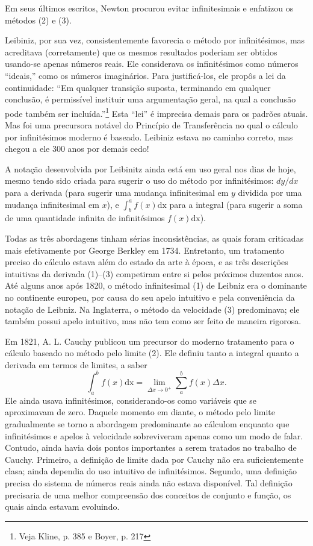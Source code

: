 Em seus últimos escritos, Newton procurou evitar infinitesimais e
enfatizou os métodos (2) e (3). 

Leibiniz, por sua vez, consistentemente favorecia o método por infinitésimos,
mas acreditava (corretamente) que os mesmos resultados poderiam ser
obtidos usando-se apenas números reais. Ele considerava os infinitésimos
como números ``ideais,'' como os números imaginários. Para justificá-los,
ele propôs a lei da continuidade: ``Em qualquer transição suposta,
terminando em qualquer conclusão, é permissível instituir uma argumentação
geral, na qual a conclusão pode também ser incluída.''\footnote{Veja Kline, p. 385 e Boyer, p. 217} Esta ``lei'' é imprecisa demais para os padrões
atuais. Mas foi uma precursora notável do Princípio de Transferência
no qual o cálculo por infinitésimos moderno é baseado. Leibiniz estava
no caminho correto, mas chegou a ele 300 anos por demais cedo!

A notação desenvolvida por Leibinitz ainda está em uso geral nos dias de hoje,
mesmo tendo sido criada para sugerir o uso do método por infinitésimos:
$dy/dx$ para a derivada (para sugerir uma mudança infinitesimal em $y$
dividida por uma mudança infinitesimal em $x$), e $\int_b^a f(x) \mathrm{dx}$ para a integral (para sugerir a soma de uma quantidade infinita de
infinitésimos $f(x) \mathrm{dx}$).

Todas as três abordagens tinham sérias inconsistências, as quais foram
criticadas mais efetivamente por George Berkley em 1734. Entretanto, um tratamento
preciso do cálculo estava além do estado da arte à época, e as
três descrições intuitivas da derivada (1)--(3) competiram entre si
pelos próximos duzentos anos. Até alguns anos após 1820,
o método infinitesimal (1) de Leibniz era o dominante no continente
europeu, por causa do seu apelo intuitivo e pela conveniência da
notação de Leibniz. Na Inglaterra, o método da velocidade (3)
predominava; ele também possui apelo intuitivo, mas não tem como
ser feito de maneira rigorosa.

Em 1821, A. L. Cauchy publicou um precursor do moderno tratamento para
o cálculo baseado no método pelo limite (2). Ele definiu tanto a integral
quanto a derivada em termos de limites, a saber
\[
\int_a^b f(x) \mathrm{dx} = \lim_{\Delta x \rightarrow 0^+} \sum_{a}^{b} f(x) \Delta x.
\]
Ele ainda usava infinitésimos, considerando-os como variáveis que
se aproximavam de zero. Daquele momento em diante, o método pelo
limite gradualmente se torno a abordagem predominante ao cálculom
enquanto que infinitésimos e apelos à velocidade sobreviveram apenas
como um modo de falar. Contudo, ainda havia dois pontos importantes a serem
tratados no trabalho de Cauchy. Primeiro, a definição de limite dada por
Cauchy não era suficientemente clasa; ainda dependia do uso intuitivo
de infinitésimos. Segundo, uma definição precisa do sistema de números
reais ainda não estava disponível. Tal definição precisaria de uma
melhor compreensão dos conceitos de conjunto e função, os quais ainda
estavam evoluindo.

